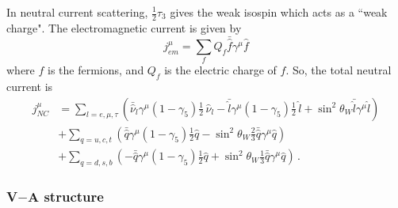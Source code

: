  In neutral current scattering, $\frac{1}{2}\tau_3$ gives the weak isospin
  which acts as a ``weak charge". The electromagnetic current is given by
  \begin{equation}
      j^{\mu}_{em} = \sum_f Q_f \bar{\hat{f}} \gamma^{\mu} \hat{f}
  \end{equation}
  where $f$ is the fermions, and $Q_f$ is the electric charge of $f$.
  So, the total neutral current is
  \begin{equation}
    \begin{aligned}
        j^{\mu}_{NC} &= \sum_{l=e,\mu,\tau} \left(\bar{\hat{\nu}}_{l}
        \gamma^{\mu}(1-\gamma_5) \frac{1}{2}\, \hat{\nu}_{l} - \bar{\hat{l}}
        \gamma^{\mu}(1-\gamma_5) \frac{1}{2}\, \hat{l} 
        +\sin^2\theta_W \bar{\hat{l}}\gamma^{\mu}\hat{l} \right) \\
        &+ \sum_{q=u,c,t} \left(\bar{\hat{q}} \gamma^{\mu}(1-\gamma_5)\frac{1}{2}\hat{q} 
        - \sin^2\theta_W \frac{2}{3} \bar{\hat{q}}\gamma^{\mu}\hat{q} \right) \\
        &+ \sum_{q=d,s,b} \left(- \bar{\hat{q}} \gamma^{\mu}(1-\gamma_5)\frac{1}{2}\hat{q} 
        + \sin^2\theta_W \frac{1}{3} \bar{\hat{q}}\gamma^{\mu}\hat{q} \right) \,.
     \end{aligned}
  \end{equation}
 
  \subsubsection{V$-$A structure}

